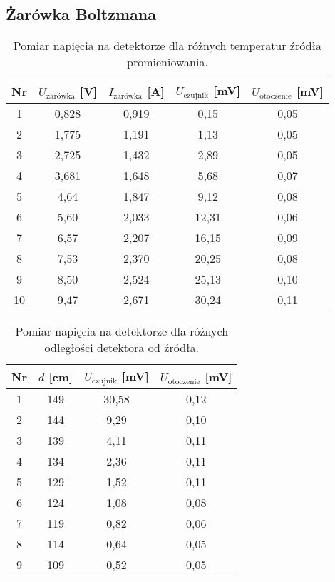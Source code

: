 \documentclass[12pt]{article}
\begin{document}
\subsection{Żarówka Boltzmana}
\begin{table}[H]
    \centering
    \begin{tabular}{c|c|c|c|c}
        \toprule
        Nr & $U_\text{żarówka}$ [V] & $I_\text{żarówka}$ [A] & $U_\text{czujnik}$ [mV] & $U_\text{otoczenie}$ [mV] \\
        \midrule
        1  & 0{,}828 & 0{,}919 & 0{,}15 & 0{,}05 \\
        2  & 1{,}775 & 1{,}191 & 1{,}13 & 0{,}05 \\
        3  & 2{,}725 & 1{,}432 & 2{,}89 & 0{,}05 \\
        4  & 3{,}681 & 1{,}648 & 5{,}68 & 0{,}07 \\
        5  & 4{,}64  & 1{,}847 & 9{,}12 & 0{,}08 \\
        6  & 5{,}60  & 2{,}033 & 12{,}31 & 0{,}06 \\
        7  & 6{,}57  & 2{,}207 & 16{,}15 & 0{,}09 \\
        8  & 7{,}53  & 2{,}370 & 20{,}25 & 0{,}08 \\
        9  & 8{,}50  & 2{,}524 & 25{,}13 & 0{,}10 \\
        10 & 9{,}47  & 2{,}671 & 30{,}24 & 0{,}11 \\
        \bottomrule
    \end{tabular}
    \caption{Pomiar napięcia na detektorze dla różnych temperatur źródła promieniowania.}
    \label{tab:temp_measurements}
\end{table}


\begin{table}[H]
    \centering
    \begin{tabular}{c|c|c|c}
        \toprule
        Nr & $d$ [cm] & $U_\text{czujnik}$ [mV] & $U_\text{otoczenie}$ [mV] \\
        \midrule
        1 & 149 & 30{,}58 & 0{,}12 \\
        2 & 144 & 9{,}29  & 0{,}10 \\
        3 & 139 & 4{,}11  & 0{,}11 \\
        4 & 134 & 2{,}36  & 0{,}11 \\
        5 & 129 & 1{,}52  & 0{,}11 \\
        6 & 124 & 1{,}08  & 0{,}08 \\
        7 & 119 & 0{,}82  & 0{,}06 \\
        8 & 114 & 0{,}64  & 0{,}05 \\
        9 & 109 & 0{,}52  & 0{,}05 \\
        \bottomrule
    \end{tabular}
    \caption{Pomiar napięcia na detektorze dla różnych odległości detektora od źródła.}
    \label{tab:distance_measurements}
\end{table}
\end{document}

